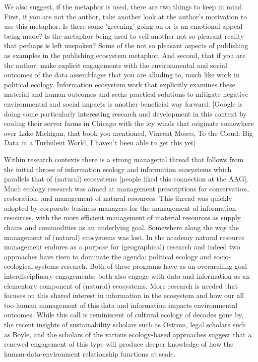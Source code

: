 We also suggest, if the metaphor is used, there are two things to keep in mind. First, if you are not the author, take another look at the author's motivation to use this metaphor. Is there some 'greening' going on or is an emotional appeal being made? Is the metaphor being used to veil another not so pleasant reality that perhaps is left unspoken? Some of the not so pleasant aspects of publishing as examples in the publishing ecosystem metaphor. And second, that if you are the author, make explicit engagements with the environmental and social outcomes of the data assemblages that you are alluding to, much like work in political ecology. Information ecosystem work that explicitly examines these material and human outcomes and seeks practical solutions to mitigate negative environmental and social impacts is another beneficial way forward. [Google is doing some particularly interesting research and development in this context by cooling their server farms in Chicago with the icy winds that originate somewhere over Lake Michigan, that book you mentioned, Vincent Mosco, To the Cloud: Big Data in a Turbulent World, I haven't been able to get this yet]

Within research contexts there is a strong managerial thread that follows from the initial throes of information ecology and information ecosystems which parallels that of (natural) ecosystems [people liked this connection at the AAG]. Much ecology research was aimed at management prescriptions for conservation, restoration, and management of natural resources. This thread was quickly adopted by corporate business managers for the management of information resources, with the more efficient management of material resources as supply chains and commodities as an underlying goal. Somewhere along the way the management of (natural) ecosystems was lost. In the academy natural resource management endures as a purpose for (geographical) research and indeed two approaches have risen to dominate the agenda: political ecology and socio-ecological systems research. Both of these programs have as an overarching goal interdisciplinary engagements; both also engage with data and information as an elementary component of (natural) ecosystems. More research is needed that focuses on this shared interest in information in the ecosystem and how our all too human management of this data and information impacts environmental outcomes. While this call is reminiscent of cultural ecology of decades gone by, the recent insights of sustainability scholars such as Ostrom, legal scholars such as Boyle, and the scholars of the various ecology-based approaches suggest that a renewed engagement of this type will produce deeper knowledge of how the human-data-environment relationship functions at scale.

